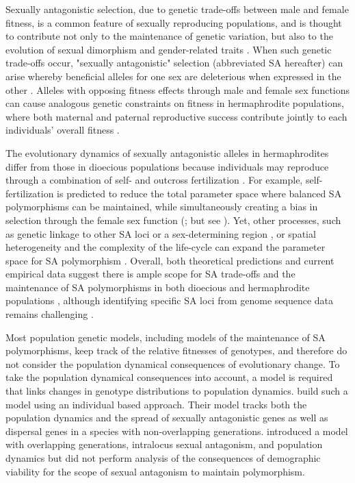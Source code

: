 \documentclass[11pt]{article}
\begin{document}
Sexually antagonistic selection, due to genetic trade-offs between male and female fitness, is a common feature of sexually reproducing populations, and is thought to contribute not only to the maintenance of genetic variation, but also to the evolution of sexual dimorphism and gender-related traits \citep{Lande1980, Rice1992, Charlesworth1999, RiceChippindale2001, BondurianskyChenoweth2009,Olito2019}. When such genetic trade-offs occur, "sexually antagonistic" selection (abbreviated SA hereafter) can arise whereby beneficial alleles for one sex are deleterious when expressed in the other \citep{Kidwell1977, Rice1992, ConnallonClark2012}. Alleles with opposing fitness effects through male and female sex functions can cause analogous genetic constraints on fitness in hermaphrodite populations, where both maternal and paternal reproductive success contribute jointly to each individuals' overall fitness \citep{LloydWebb1986, WebbLloyd1986, Abbott2011, JordanConnallon2014}. 


The evolutionary dynamics of sexually antagonistic alleles in hermaphrodites differ from those in dioecious populations because individuals may reproduce through a combination of self- and outcross fertilization \citep{Goodwillie2005, Igic2006, JarneAuld2006}. For example, self-fertilization is predicted to reduce the total parameter space where balanced SA polymorphisms can be maintained, while simultaneously creating a bias in selection through the female sex function (\citealt{JordanConnallon2014}; but see \citealt{Tazzyman2015}). Yet, other processes, such as genetic linkage to other SA loci or a sex-determining region \citep{Otto2011, JordanCharlesworth2012, Olito2017, Olito2019}, or spatial heterogeneity and the complexity of the life-cycle can expand the parameter space for SA polymorphism \citep{Olito-etal-2018,ConnallonSharmaOlito2019}. Overall, both theoretical predictions and current empirical data suggest there is ample scope for SA trade-offs and the maintenance of SA polymorphisms in both dioecious and hermaphrodite populations \citep{Abbott2011, WangBarrett2020}, although identifying specific SA loci from genome sequence data remains challenging \citep{RuzickaESEB2020}.


Most population genetic models, including models of the maintenance of SA polymorphisms, keep track of the relative fitnesses of genotypes, and therefore do not consider the population dynamical consequences of evolutionary change. To take the population dynamical consequences into account, a model is required that links changes in genotype distributions to population dynamics.  \cite{harts2014demography} build such a model using an individual based approach. Their model tracks both the population dynamics and the spread of sexually antagonistic genes as well as dispersal genes in a species with non-overlapping generations. \cite{deVriesCaswell2019b} introduced a model with overlapping generations, intralocus sexual antagonism, and population dynamics but did not perform analysis of the consequences of demographic viability for the scope of sexual antagonism to maintain polymorphism. 
\end{document}
